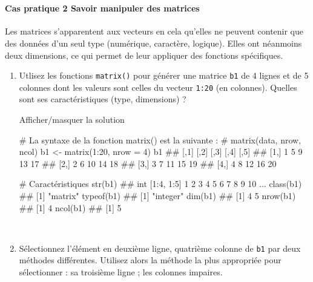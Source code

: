\documentclass[12pt,]{article}
\newenvironment{Shaded}{}{}
\newcommand{\KeywordTok}[1]{\textcolor[rgb]{0.00,0.00,1.00}{{#1}}}
\newcommand{\DataTypeTok}[1]{{#1}}
\newcommand{\DecValTok}[1]{{#1}}
\newcommand{\StringTok}[1]{\textcolor[rgb]{0.00,0.50,0.50}{{#1}}}
\newcommand{\CommentTok}[1]{\textcolor[rgb]{0.00,0.50,0.00}{{#1}}}
\newcommand{\NormalTok}[1]{{#1}}
\let\oldparagraph\paragraph
\renewcommand{\paragraph}[1]{\oldparagraph{#1}\mbox{}}
\begin{document}
~

\paragraph{\texorpdfstring{\textbf{Cas pratique 2} Savoir manipuler des
matrices}{Cas pratique 2 Savoir manipuler des matrices}}\label{cas-pratique-2-savoir-manipuler-des-matrices}

Les matrices s'apparentent aux vecteurs en cela qu'elles ne peuvent
contenir que des données d'un seul type (numérique, caractère, logique).
Elles ont néanmoins deux dimensions, ce qui permet de leur appliquer des
fonctions spécifiques.

\begin{enumerate}
\def\labelenumi{\alph{enumi}.}
\item
  Utlisez les fonctions \texttt{matrix()} pour générer une matrice
  \texttt{b1} de 4 lignes et de 5 colonnes dont les valeurs sont celles
  du vecteur \texttt{1:20} (en colonnes). Quelles sont ses
  caractéristiques (type, dimensions) ?

  Afficher/masquer la solution

  \hypertarget{sol6}{}
\begin{Shaded}
\begin{Highlighting}[]
\CommentTok{# La syntaxe de la fonction matrix() est la suivante : }
\CommentTok{# matrix(data, nrow, ncol)}
\NormalTok{b1 <-}\StringTok{ }\KeywordTok{matrix}\NormalTok{(}\DecValTok{1}\NormalTok{:}\DecValTok{20}\NormalTok{, }\DataTypeTok{nrow =} \DecValTok{4}\NormalTok{)}
\NormalTok{b1}
\NormalTok{##      [,1] [,2] [,3] [,4] [,5]}
\NormalTok{## [1,]    1    5    9   13   17}
\NormalTok{## [2,]    2    6   10   14   18}
\NormalTok{## [3,]    3    7   11   15   19}
\NormalTok{## [4,]    4    8   12   16   20}

\CommentTok{# Caractéristiques}
\KeywordTok{str}\NormalTok{(b1)}
\NormalTok{##  int [1:4, 1:5] 1 2 3 4 5 6 7 8 9 10 ...}
\KeywordTok{class}\NormalTok{(b1)}
\NormalTok{## [1] "matrix"}
\KeywordTok{typeof}\NormalTok{(b1)}
\NormalTok{## [1] "integer"}
\KeywordTok{dim}\NormalTok{(b1)}
\NormalTok{## [1] 4 5}
\KeywordTok{nrow}\NormalTok{(b1)}
\NormalTok{## [1] 4}
\KeywordTok{ncol}\NormalTok{(b1)}
\NormalTok{## [1] 5}
\end{Highlighting}
\end{Shaded}

  ~
\item
  Sélectionnez l'élément en deuxième ligne, quatrième colonne de
  \texttt{b1} par deux méthodes différentes. Utilisez alors la méthode
  la plus appropriée pour sélectionner : sa troisième ligne ; les
  colonnes impaires.


\end{enumerate}
\end{document}
